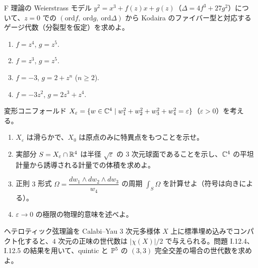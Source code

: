 F 理論の Weierstrass モデル $y^2=x^3+f(z)x+g(z)$（$\Delta=4f^3+27g^2$）について、$z=0$ での $(\mathrm{ord}f,\ \mathrm{ord}g,\ \mathrm{ord}\Delta)$ から Kodaira のファイバー型と対応するゲージ代数（分裂型を仮定）を求めよ。
\begin{enumerate}
  \item $f=z^4$, $g=z^5$.
  \item $f=z^3$, $g=z^5$.
  \item $f=-3$, $g=2+z^n$ ($n\geq 2$).
  \item $f=-3z^2$, $g=2z^3+z^4$.
\end{enumerate}

変形コニフォールド $X_\varepsilon=\{w\in\mathbb{C}^4\mid w_1^2+w_2^2+w_3^2+w_4^2=\varepsilon\}$（$\varepsilon>0$）を考える。
\begin{enumerate}
  \item $X_\varepsilon$ は滑らかで、$X_0$ は原点のみに特異点をもつことを示せ。
  \item 実部分 $S=X_\varepsilon\cap\mathbb{R}^4$ は半径 $\sqrt\varepsilon$ の $3$ 次元球面であることを示し、$\mathbb{C}^4$ の平坦計量から誘導される計量での体積を求めよ。
  \item 正則 $3$ 形式 $\Omega=\dfrac{dw_1\wedge dw_2\wedge dw_3}{w_4}$ の周期 $\displaystyle\int_S\Omega$ を計算せよ（符号は向きによる）。
  \item $\varepsilon\to0$ の極限の物理的意味を述べよ。
\end{enumerate}

ヘテロティック弦理論を Calabi--Yau $3$ 次元多様体 $X$ 上に標準埋め込みでコンパクト化すると、$4$ 次元の正味の世代数は $|\chi(X)|/2$ で与えられる。問題 I.12.4、I.12.5 の結果を用いて、quintic と $\mathbb{P}^5$ の $(3,3)$ 完全交差の場合の世代数を求めよ。
